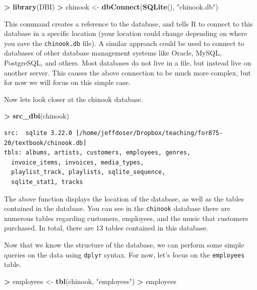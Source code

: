 \documentclass[
]{krantz}
\makeatletter
\newenvironment{Shaded}{\begin{snugshade}}{\end{snugshade}}
\newcommand{\KeywordTok}[1]{\textcolor[rgb]{0.27,0.27,0.27}{\textbf{#1}}}
\newcommand{\NormalTok}[1]{#1}
\newcommand{\OperatorTok}[1]{\textcolor[rgb]{0.43,0.43,0.43}{\textbf{#1}}}
\newcommand{\StringTok}[1]{\textcolor[rgb]{0.5,0.5,0.5}{#1}}
\newenvironment{kframe}{%
\medskip{}
\setlength{\fboxsep}{.8em}
 \def\at@end@of@kframe{}%
 \ifinner\ifhmode%
  \def\at@end@of@kframe{\end{minipage}}%
  \begin{minipage}{\columnwidth}%
 \fi\fi%
 \def\FrameCommand##1{\hskip\@totalleftmargin \hskip-\fboxsep
 \colorbox{shadecolor}{##1}\hskip-\fboxsep
     \hskip-\linewidth \hskip-\@totalleftmargin \hskip\columnwidth}%
 \MakeFramed {\advance\hsize-\width
   \@totalleftmargin\z@ \linewidth\hsize
   \@setminipage}}%
 {\par\unskip\endMakeFramed%
 \at@end@of@kframe}
\renewenvironment{Shaded}{\begin{kframe}}{\end{kframe}}
\makeatother
\begin{document}
\begin{Shaded}
\begin{Highlighting}[]
\OperatorTok{\textgreater{}}\StringTok{ }\KeywordTok{library}\NormalTok{(DBI)}
\OperatorTok{\textgreater{}}\StringTok{ }\NormalTok{chinook \textless{}{-}}\StringTok{ }\KeywordTok{dbConnect}\NormalTok{(}\KeywordTok{SQLite}\NormalTok{(), }\StringTok{"chinook.db"}\NormalTok{)}
\end{Highlighting}
\end{Shaded}

This command creates a reference to the database, and tells R to connect to this database in a specific location (your location could change depending on where you save the \texttt{chinook.db} file). A similar approach could be used to connect to databases of other database management systems like Oracle, MySQL, PostgreSQL, and others. Most databases do not live in a file, but instead live on another server. This causes the above connection to be much more complex, but for now we will focus on this simple case.

Now lets look closer at the chinook database.

\begin{Shaded}
\begin{Highlighting}[]
\OperatorTok{\textgreater{}}\StringTok{ }\KeywordTok{src\_dbi}\NormalTok{(chinook)}
\end{Highlighting}
\end{Shaded}

\begin{verbatim}
src:  sqlite 3.22.0 [/home/jeffdoser/Dropbox/teaching/for875-20/textbook/chinook.db]
tbls: albums, artists, customers, employees, genres,
  invoice_items, invoices, media_types,
  playlist_track, playlists, sqlite_sequence,
  sqlite_stat1, tracks
\end{verbatim}

The above function displays the location of the database, as well as the tables contained in the database. You can see in the \texttt{chinook} database there are numerous tables regarding customers, employees, and the music that customers purchased. In total, there are 13 tables contained in this database.

Now that we know the structure of the database, we can perform some simple queries on the data using \texttt{dplyr} syntax. For now, let's focus on the \texttt{employees} table.

\begin{Shaded}
\begin{Highlighting}[]
\OperatorTok{\textgreater{}}\StringTok{ }\NormalTok{employees \textless{}{-}}\StringTok{ }\KeywordTok{tbl}\NormalTok{(chinook, }\StringTok{"employees"}\NormalTok{)}
\OperatorTok{\textgreater{}}\StringTok{ }\NormalTok{employees}
\end{Highlighting}
\end{Shaded}
\end{document}
